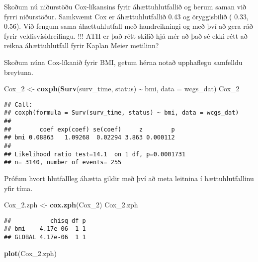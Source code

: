 \documentclass[
]{book}
\newenvironment{Shaded}{\begin{snugshade}}{\end{snugshade}}
\newcommand{\DataTypeTok}[1]{\textcolor[rgb]{0.13,0.29,0.53}{#1}}
\newcommand{\DecValTok}[1]{\textcolor[rgb]{0.00,0.00,0.81}{#1}}
\newcommand{\FloatTok}[1]{\textcolor[rgb]{0.00,0.00,0.81}{#1}}
\newcommand{\KeywordTok}[1]{\textcolor[rgb]{0.13,0.29,0.53}{\textbf{#1}}}
\newcommand{\NormalTok}[1]{#1}
\newcommand{\OperatorTok}[1]{\textcolor[rgb]{0.81,0.36,0.00}{\textbf{#1}}}
\newcommand{\StringTok}[1]{\textcolor[rgb]{0.31,0.60,0.02}{#1}}
\begin{document}
Skoðum nú niðurstöðu Cox-líkansins fyrir áhættuhlutfallið og berum saman við fyrri niðurstöður. Samkvæmt Cox er áhættuhlutfallið 0.43 og öryggisbilið ( 0.33, 0.56). Við fengum sama áhættuhlutfall með handreikningi og með því að gera ráð fyrir veldisvísidreifingu. !!! ATH er það rétt skilið hjá mér að það sé ekki rétt að reikna áhættuhlutfall fyrir Kaplan Meier metilinn?

Skoðum núna Cox-líkanið fyrir BMI, getum hérna notað upphaflegu samfelldu breytuna.

\begin{Shaded}
\begin{Highlighting}[]
\NormalTok{Cox\_}\DecValTok{2}\NormalTok{ <{-}}\StringTok{ }\KeywordTok{coxph}\NormalTok{(}\KeywordTok{Surv}\NormalTok{(surv\_time, status) }\OperatorTok{\textasciitilde{}}\StringTok{ }\NormalTok{bmi, }\DataTypeTok{data =}\NormalTok{ wcgs\_dat)}
\NormalTok{Cox\_}\DecValTok{2}
\end{Highlighting}
\end{Shaded}

\begin{verbatim}
## Call:
## coxph(formula = Surv(surv_time, status) ~ bmi, data = wcgs_dat)
## 
##        coef exp(coef) se(coef)     z        p
## bmi 0.08863   1.09268  0.02294 3.863 0.000112
## 
## Likelihood ratio test=14.1  on 1 df, p=0.0001731
## n= 3140, number of events= 255
\end{verbatim}

Prófum hvort hlutfallleg áhætta gildir með því að meta leitnina í hættuhlutfallinu yfir tíma.

\begin{Shaded}
\begin{Highlighting}[]
\NormalTok{Cox\_}\FloatTok{2.}\NormalTok{zph <{-}}\StringTok{ }\KeywordTok{cox.zph}\NormalTok{(Cox\_}\DecValTok{2}\NormalTok{)}
\NormalTok{Cox\_}\FloatTok{2.}\NormalTok{zph}
\end{Highlighting}
\end{Shaded}

\begin{verbatim}
##           chisq df p
## bmi    4.17e-06  1 1
## GLOBAL 4.17e-06  1 1
\end{verbatim}

\begin{Shaded}
\begin{Highlighting}[]
\KeywordTok{plot}\NormalTok{(Cox\_}\FloatTok{2.}\NormalTok{zph)}
\end{Highlighting}
\end{Shaded}
\end{document}
